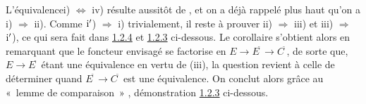 \documentclass[10pt]{../fichiers-configuration-latex/smfart}
\begin{document}
L'équivalence\pageoriginale i) $\Leftrightarrow$ iv) résulte
aussitôt de , et on a déjà rappelé plus haut
qu'on a i) $\Rightarrow$ ii). Comme ${\rm i'}$) $\Rightarrow$ i)
trivialement, il reste à prouver ii) $\Rightarrow$ iii) et iii)
$\Rightarrow$ ${\rm i'}$), ce qui sera fait dans
\hyperref[IV.subsubsec1.2.4]{1.2.4} et \hyperref[IV.subsubsec1.2.3]{1.2.3} ci-dessous. Le
corollaire s'obtient alors en remarquant que le foncteur envisagé
se factorise en $E\rightarrow E^{\widetilde{\phantom{,}}}\rightarrow
C^{\widetilde{\phantom{,}}}$, de sorte que, $E\rightarrow
E^{\widetilde{\phantom{,}}}$ étant une équivalence en vertu de
(iii), la question revient à celle de déterminer quand
$E^{\widetilde{\phantom{,}}}\rightarrow C^{\widetilde{\phantom{,}}}$
est une équivalence. On conclut alors grâce au « lemme de
comparaison »  , \cf démonstration
\hyperref[IV.subsubsec1.2.3]{1.2.3} ci-dessous.

\setcounter{subsection}{2} \setcounter{subsubsection}{2}
\end{document}
